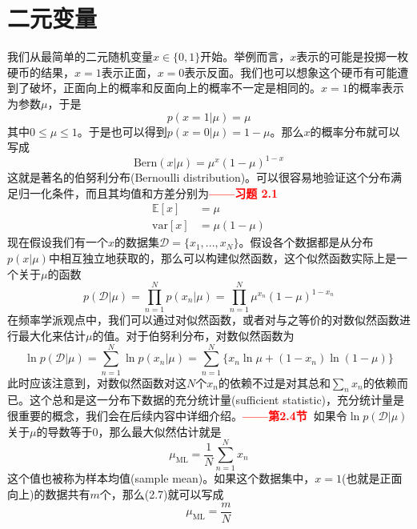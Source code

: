 \documentclass[b5paper]{book}
\numberwithin{equation}{chapter}
\newcommand {\insertline} {\noindent{\color{red} \rule[5pt]{\textwidth}{0.1em}}}
\begin{document}
	\section{二元变量}
	\insertline
	\textnormal{
	\indent 我们从最简单的二元随机变量$x \in \{0,1\}$开始。举例而言，$x$表示的可能是投掷一枚硬币的结果，$x=1$表示正面，$x=0$表示反面。我们也可以想象这个硬币有可能遭到了破坏，正面向上的概率和反面向上的概率不一定是相同的。$x=1$的概率表示为参数$\mu$，于是
	\begin{equation}
		p(x=1|\mu)=\mu
	\end{equation}
	其中$0 \leqslant \mu \leqslant 1$。于是也可以得到$p(x=0|\mu) = 1-\mu$。那么$x$的概率分布就可以写成
	\begin{equation}
		\mathrm{Bern}(x|\mu)=\mu^x(1-\mu)^{1-x} 
	\end{equation}
	这就是著名的伯努利分布(Bernoulli distribution)。可以很容易地验证这个分布满足归一化条件，而且其均值和方差分别为\textcolor{red}{\textbf{——习题 2.1}}
	\begin{align}
		\mathbb{E}[x]&=\mu \\
		\mathrm{var}[x]&=\mu(1-\mu)
	\end{align}
	\indent 现在假设我们有一个$x$的数据集$\mathcal{D}=\{x_1,...,x_N\}$。假设各个数据都是从分布$p(x|\mu)$中相互独立地获取的，那么可以构建似然函数，这个似然函数实际上是一个关于$\mu$的函数
	\begin{equation}
		p(\mathcal{D}|\mu)=\prod_{n=1}^{N}p(x_n|\mu)=\prod_{n=1}^N\mu^{x_n}(1-\mu)^{1-x_n}
	\end{equation}
	在频率学派观点中，我们可以通过对似然函数，或者对与之等价的对数似然函数进行最大化来估计$\mu$的值。对于伯努利分布，对数似然函数为
	\begin{equation}
		\ln p(\mathcal{D}|\mu) = \sum_{n=1}^N\ln p(x_n|\mu) = \sum_{n=1}^N \{x_n \ln \mu + (1-x_n)\ln(1-\mu)\}
	\end{equation}
	此时应该注意到，对数似然函数对这$N$个$x_n$的依赖不过是对其总和$\sum_n x_n$的依赖而已。这个总和是这一分布下数据的充分统计量(sufficient statistic)，充分统计量是很重要的概念，我们会在后续内容中详细介绍。\textcolor{red}{\textbf{——第2.4节\ }}如果令$\ln p(\mathcal{D}|\mu)$关于$\mu$的导数等于0，那么最大似然估计就是
	\begin{equation}
		\mu_{\mathrm{ML}}=\frac{1}{N}\sum_{n=1}^N x_n
	\end{equation}
	这个值也被称为样本均值(sample mean)。如果这个数据集中，$x=1$(也就是正面向上)的数据共有$m$个，那么(2.7)就可以写成
	\begin{equation}
		\mu_{\mathrm{ML}} = \frac{m}{N}

\end{equation}}
\end{document}
